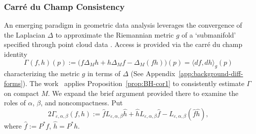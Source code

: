 \documentclass{article}
\theoremstyle{remark}
\theoremstyle{plain}
\begin{document}
\subsubsection{Carré du Champ Consistency}
\label{subsubsec:cdc-consistency}
An emerging paradigm in geometric data analysis leverages the convergence of the Laplacian \( \Delta \) to approximate the Riemannian metric $g$ of a `submanifold' specified through point cloud data \cite{giannakis-berry2020,jones2024diffusiongeometry}. Access is provided via the carré du champ identity
\begin{equation}
    \Gamma_{}(f,h)(p) := \Big( f \Delta_M h + h \Delta_M f - \Delta_M(fh)\Big)(p) = \langle df,dh\rangle_g(p)
    \label{eqn:one-of-many-cdc-identities}
\end{equation} characterizing the metric \( g \) in terms of \( \Delta \) (See Appendix~\ref{app:background-diff-forms}). The work~\cite{jones2026manifolddiffusiongeometrycurvature} applies Proposition~\ref{prop:BH-cor1} to consistently estimate \( \Gamma \) on compact \( M \). We expand the brief argument provided there to examine the roles of \( \alpha \), \( \beta \), and noncompactness. Put \[
2\Gamma_{\varepsilon, \alpha, \beta}(f,h):=\hat{f} L_{\varepsilon, \alpha, \beta}\hat{h} + \hat{h}L_{\varepsilon, \alpha, \beta}\hat{f}-L_{\varepsilon, \alpha, \beta}(\hat{f}\hat{h}),
\]
where $\hat{f}:=P^{*}f$, $\hat{h}=P^{*}h$. 
\end{document}
